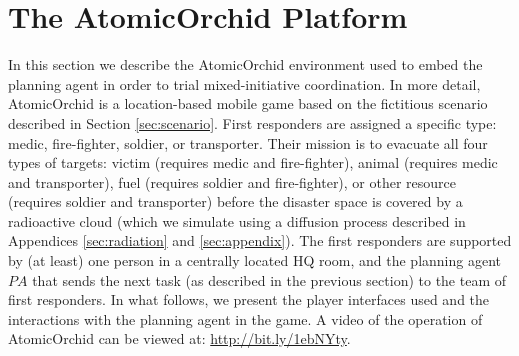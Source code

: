 \section{The A\lowercase{tomic}O\lowercase{rchid} Platform}\label{sec:atomicorchid}
\noindent In this section we describe the AtomicOrchid environment used to embed the planning agent in order to trial mixed-initiative coordination.  In more detail, AtomicOrchid is a location-based mobile game based on the fictitious scenario described in Section \ref{sec:scenario}. First responders are assigned a specific type: medic, fire-fighter, soldier, or transporter. Their mission is to evacuate all four types of targets: victim (requires medic and fire-fighter), animal (requires medic and transporter), fuel (requires soldier and fire-fighter), or other resource (requires soldier and transporter) before the disaster space is covered by a radioactive cloud (which we simulate using a diffusion process described in Appendices \ref{sec:radiation} and \ref{sec:appendix}).  The first responders are supported by (at least) one person in a centrally located HQ room, and the planning agent $PA$ that sends the next task (as described in the previous section) to the team of first responders. In what follows, we present the player interfaces used and the interactions with the planning agent in the game. A video of the operation of AtomicOrchid can be viewed at: \url{http://bit.ly/1ebNYty}.






